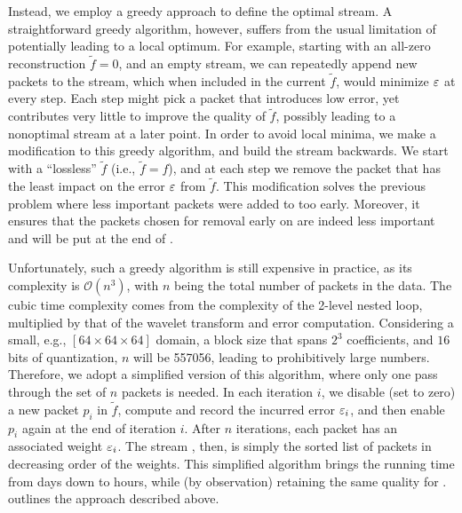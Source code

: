 Instead, we employ a greedy approach to define the optimal stream.  A straightforward greedy
algorithm, however, suffers from the usual limitation of potentially leading to a local optimum. For
example, starting with an all-zero reconstruction $\tilde{f}=0$, and an empty stream, we can
repeatedly append new packets to the stream, which when included in the current $\tilde{f}$, would
minimize $\err$ at every step. Each step might pick a packet that introduces low error, yet
contributes very little to improve the quality of $\tilde{f}$, possibly leading to a nonoptimal
stream at a later point. In order to avoid local minima, we make a modification to this greedy
algorithm, and build the stream backwards. We start with a ``lossless'' $\tilde{f}$ (i.e.,
$\tilde{f}=f$), and at each step we remove the packet that has the least impact on the error $\err$
from $\tilde{f}$. This modification solves the previous problem where less important packets were
added to \sopt too early. Moreover, it ensures that the packets chosen for removal early on are
indeed less important and will be put at the end of \sopt.

Unfortunately, such a greedy algorithm is still expensive in practice, as its complexity is
$\mathcal{O}(n^3)$, with $n$ being the total number of packets in the data. The cubic time
complexity comes from the complexity of the 2-level nested loop, multiplied by that of the wavelet
transform and error computation. Considering a small, e.g., $[64 \times 64 \times 64]$ domain, a
block size that spans $2^3$ coefficients, and $16$ bits of quantization, $n$ will be 557056, leading
to prohibitively large numbers. Therefore, we adopt a simplified version of this algorithm, where
only one pass through the set of $n$ packets is needed. In each iteration $i$, we disable (set to
zero) a new packet $p_i$ in $\tilde{f}$, compute and record the incurred error $\err_i$, and then
enable $p_i$ again at the end of iteration $i$. After $n$ iterations, each packet has an associated
weight $\err_i$. The stream \sopt, then, is simply the sorted list of packets in decreasing order of
the weights. This simplified algorithm brings the running time from days down to hours, while (by
observation) retaining the same quality for \sopt.  outlines the approach described
above.

